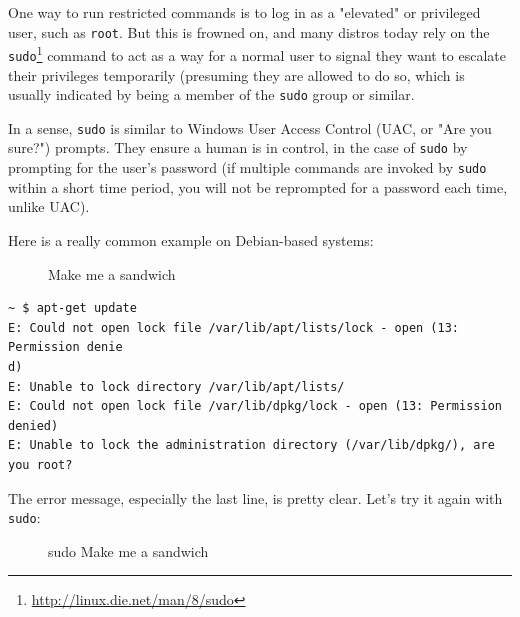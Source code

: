 \documentclass[10pt,]{book}
\renewcommand{\href}[2]{#2\footnote{\url{#1}}}
\numberwithin{figure}{chapter}
\DeclareRobustCommand{\drcap}[1]{\begin{figure}[H]\caption{#1}\end{figure}}
\DeclareRobustCommand{\drcmd}[1]{\index{Commands!#1}}
\begin{document}
One way to run restricted commands is to log in as a "elevated" or
privileged user, such as \texttt{root}. But this is frowned on, and many
distros today rely on the
\href{http://linux.die.net/man/8/sudo}{\texttt{sudo}}\drcmd{sudo}
command to act as a way for a normal user to signal they want to
escalate their privileges temporarily (presuming they are allowed to do
so, which is usually indicated by being a member of the \texttt{sudo}
group or similar.

In a sense, \texttt{sudo} is similar to Windows User Access Control
(UAC, or "Are you sure?") prompts. They ensure a human is in control, in
the case of \texttt{sudo} by prompting for the user's password (if
multiple commands are invoked by \texttt{sudo} within a short time
period, you will not be reprompted for a password each time, unlike
UAC).

Here is a really common example on Debian-based systems:

\drcap{Make me a sandwich}

\begin{verbatim}
~ $ apt-get update
E: Could not open lock file /var/lib/apt/lists/lock - open (13: Permission denie
d)
E: Unable to lock directory /var/lib/apt/lists/
E: Could not open lock file /var/lib/dpkg/lock - open (13: Permission denied)
E: Unable to lock the administration directory (/var/lib/dpkg/), are you root?
\end{verbatim}

The error message, especially the last line, is pretty clear. Let's try
it again with \texttt{sudo}:

\drcap{sudo Make me a sandwich}
\end{document}
